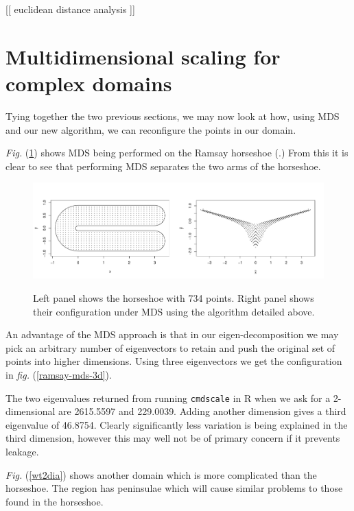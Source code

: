 \documentclass[a4paper,10pt]{amsart}
\newcommand{\fig}[1]{\emph{fig.} (\ref{#1})}
\newcommand{\Fig}[1]{\emph{Fig.} (\ref{#1})}
\begin{document}
[[ euclidean distance analysis ]]


\section{Multidimensional scaling for complex domains}

Tying together the two previous sections, we may now look at how, using MDS and our new algorithm, we can reconfigure the points in our domain.

\Fig{ramsay-mds} shows MDS being performed on the Ramsay horseshoe (\cite{ramsay}.) From this it is clear to see that performing MDS separates the two arms of the horseshoe.

\begin{figure}
\centering
\includegraphics[trim=0in 0.5in 0in 0.25in, width=5.5in]{figs/ramsay-mds.pdf} \\
\caption{Left panel shows the horseshoe with 734 points. Right panel shows their configuration under MDS using the algorithm detailed above.}
\label{ramsay-mds}
\end{figure}

An advantage of the MDS approach is that in our eigen-decomposition we may pick an arbitrary number of eigenvectors to retain and push the original set of points into higher dimensions. Using three eigenvectors we get the configuration in \fig{ramsay-mds-3d}.

The two eigenvalues returned from running \texttt{cmdscale} in \textsf{R} when we ask for a 2-dimensional are 2615.5597 and 229.0039. Adding another dimension gives a third eigenvalue of 46.8754. Clearly significantly less variation is being explained in the third dimension, however this may well not be of primary concern if it prevents leakage.


\Fig{wt2dia} shows another domain which is more complicated than the horseshoe. The region has peninsulae which will cause similar problems to those found in the horseshoe. 
\end{document}
